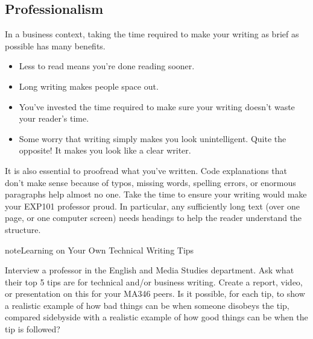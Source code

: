 \documentclass[letterpaper,10pt,english]{jupyterBook}
\begin{document}
\subsection{Professionalism}
\label{\detokenize{chapter-5-before-and-after:professionalism}}
\sphinxAtStartPar
In a business context, taking the time required to make your writing as brief as possible has many benefits.
\begin{itemize}
\item {} 
\sphinxAtStartPar
{} Less to read means you’re done reading sooner.

\item {} 
\sphinxAtStartPar
{} Long writing makes people space out.

\item {} 
\sphinxAtStartPar
{} You’ve invested the time required to make sure your writing doesn’t waste your reader’s time.

\item {} 
\sphinxAtStartPar
{} Some worry that writing simply makes you look unintelligent.  Quite the opposite!  It makes you look like a clear writer.

\end{itemize}

\sphinxAtStartPar
It is also essential to proofread what you’ve written.  Code explanations that don’t make sense because of typos, missing words, spelling errors, or enormous paragraphs help almost no one.  Take the time to ensure your writing would make your EXP101 professor proud.  In particular, any sufficiently long text (over one page, or one computer screen) needs headings to help the reader understand the structure.

\begin{sphinxadmonition}{note}{Learning on Your Own \sphinxhyphen{} Technical Writing Tips}

\sphinxAtStartPar
Interview a professor in the English and Media Studies department.  Ask what their top 5 tips are for technical and/or business writing.  Create a report, video, or presentation on this for your MA346 peers.  Is it possible, for each tip, to show a realistic example of how bad things can be when someone disobeys the tip, compared side\sphinxhyphen{}by\sphinxhyphen{}side with a realistic example of how good things can be when the tip is followed?
\end{sphinxadmonition}
\end{document}
